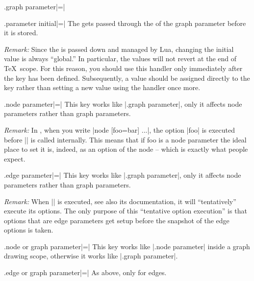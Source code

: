 \begin{handler}{{.graph parameter}|=|}
\begin{handler}{{.parameter initial}|=|}
    The  gets passed through the  of the
    graph parameter before it is stored.

    \emph{Remark:} Since the  is passed down and managed
    by Lua, changing the initial value is always ``global.'' In
    particular, the values will not revert at the end of \TeX\
    scope. For this reason, you should use this handler only
    immediately after the key has been defined. Subsequently, a value
    should be assigned directly to the key rather than setting a new
    value using the handler once more.
\begin{codeexample}
\end{codeexample}
  \end{handler}
\end{handler}

\begin{handler}{{.node parameter}|=|}
  This key works like |.graph parameter|, only it
  affects node parameters rather than graph parameters.

  \emph{Remark:} In \tikzname, when you write |node [foo=bar] {...}|,
  the option |foo| is executed before |\pgfnode| is called
  internally. This means that if foo is a node parameter the ideal
  place to set it is, indeed, as an option of the node -- which is
  exactly what people expect.
\end{handler}

\begin{handler}{{.edge parameter}|=|}
  This key works like |.graph parameter|, only it
  affects node parameters rather than graph parameters.

  \emph{Remark:} When |\pgfgdedge| is executed, see also its
  documentation, it will ``tentatively'' execute its options. The only
  purpose of this ``tentative option execution'' is that options that
  are edge parameters get setup before the snapshot of the edge
  options is taken.  
\end{handler}


\begin{handler}{{.node or graph parameter}|=|}
  This key works like |.node parameter| inside a graph drawing scope,
  otherwise it works like |.graph parameter|.
\end{handler}

\begin{handler}{{.edge or graph parameter}|=|}
  As above, only for edges.
\end{handler}




